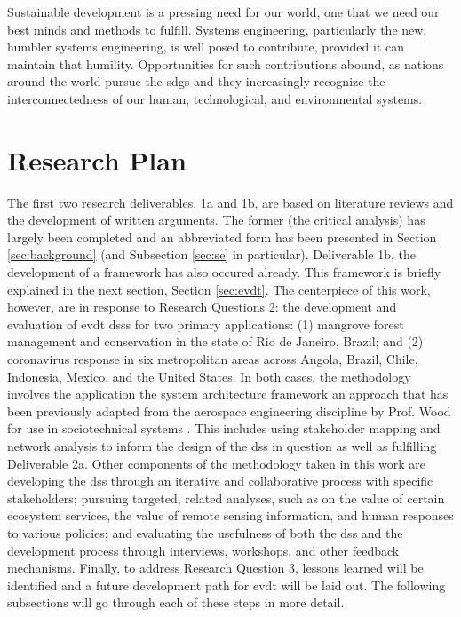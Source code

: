 \documentclass[notitlepage]{article}
\begin{document}
Sustainable development is a pressing need for our world, one that we need our best minds and methods to fulfill. Systems engineering, particularly the new, humbler systems engineering, is well posed to contribute, provided it can maintain that humility. Opportunities for such contributions abound, as nations around the world pursue the \acp{sdg} and they increasingly recognize the interconnectedness of our human, technological, and environmental systems.


\section{Research Plan}\label{sec:plan}

The first two research deliverables, 1a and 1b, are based on literature reviews and the development of written arguments. The former (the critical analysis) has largely been completed and an abbreviated form has been presented in Section \ref{sec:background} (and Subsection \ref{sec:se} in particular). Deliverable 1b, the development of a framework has also occured already. This framework is briefly explained in the next section, Section \ref{sec:evdt}. The centerpiece of this work, however, are in response to Research Questions 2: the development and evaluation of \ac{evdt} \acp{dss} for two primary applications: (1) mangrove forest management and conservation in the state of Rio de Janeiro, Brazil; and (2) coronavirus response in six metropolitan areas across Angola, Brazil, Chile, Indonesia, Mexico, and the United States. In both cases, the methodology involves the application the system architecture framework \cite{maierArtSystemsArchitecting2009, crawleySystemArchitectureStrategy2015} an approach that has been previously adapted from the aerospace engineering discipline by Prof. Wood for use in sociotechnical systems \cite{pfotenhauerArchitectingComplexInternational2016}. This includes using stakeholder mapping and network analysis to inform the design of the \ac{dss} in question as well as fulfilling Deliverable 2a. Other components of the methodology taken in this work are developing the \ac{dss} through an iterative and collaborative process with specific stakeholders; pursuing targeted, related analyses, such as on the value of certain ecosystem services, the value of remote sensing information, and human responses to various policies; and evaluating the usefulness of both the \ac{dss} and the development process through interviews, workshops, and other feedback mechanisms. Finally, to address Research Question 3, lessons learned will be identified and a future development path for \ac{evdt} will be laid out. The following subsections will go through each of these steps in more detail.
\end{document}

